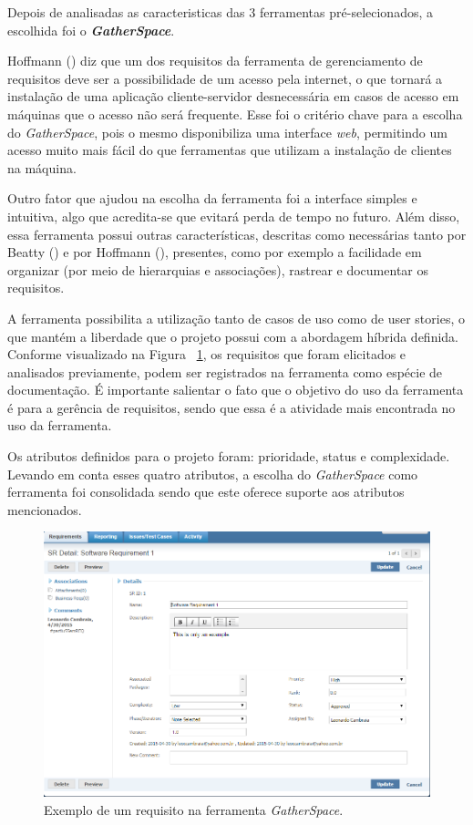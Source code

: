 
Depois de analisadas as caracteristicas das 3 ferramentas pré-selecionados, a escolhida foi o \textit{\textbf{GatherSpace}}.

Hoffmann (\citeyear{hoffmann03}) diz que um dos requisitos da ferramenta de gerenciamento de requisitos deve ser
a possibilidade de um acesso pela internet, o que tornará a instalação de uma aplicação cliente-servidor desnecessária em casos
de acesso em máquinas que o acesso não será frequente. Esse foi o critério chave para a escolha do \textit{GatherSpace}, pois o mesmo
disponibiliza uma interface \textit{web}, permitindo um acesso muito mais fácil do que ferramentas que utilizam a instalação de
clientes na máquina.

Outro fator que ajudou na escolha da ferramenta foi a interface simples e intuitiva, algo que acredita-se que evitará perda
de tempo no futuro. Além disso, essa ferramenta possui outras características, descritas como necessárias tanto por
Beatty (\citeyear{beatty13}) e por Hoffmann (\citeyear{hoffmann03}), presentes, como por exemplo a facilidade em organizar
(por meio de hierarquias e associações), rastrear e documentar os requisitos.

A ferramenta possibilita a utilização tanto de casos de uso como de user stories, o que mantém a liberdade que o projeto
possui com a abordagem híbrida definida. Conforme visualizado na Figura ~\ref{gatherspace_exemplo}, os requisitos que foram elicitados e
analisados previamente, podem ser registrados na ferramenta como espécie de documentação. É importante salientar o
fato que o objetivo do uso da ferramenta é para a gerência de requisitos, sendo que essa é a atividade mais encontrada
no uso da ferramenta.

Os atributos definidos para o projeto foram: prioridade, status e complexidade.
Levando em conta esses quatro atributos, a escolha do \textit{GatherSpace} como ferramenta foi consolidada sendo que
este oferece suporte aos atributos mencionados.

  \begin{figure}[!htbp]
    \centering
    \includegraphics[scale=0.65]{editaveis/figuras/gatherspace_exemplo}
    \caption[Exemplo de um requisito na ferramenta GatherSpace.]
	{Exemplo de um requisito na ferramenta \textit{GatherSpace}.}
    \label{gatherspace_exemplo}
  \end{figure}
  
